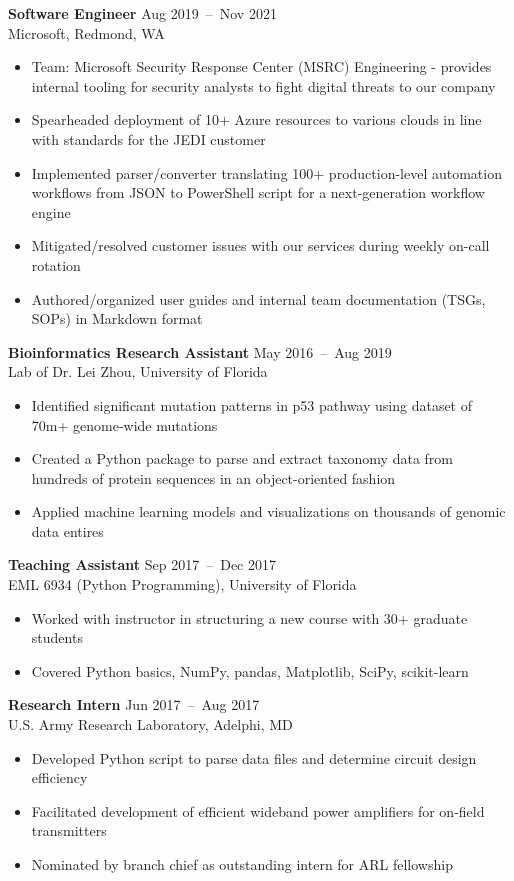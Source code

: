 \documentclass[line,resmargin]{res}
\begin{document}
\begin{resume}
    \textbf{Software Engineer}    \hfill Aug 2019~--~Nov 2021 \\
    Microsoft, Redmond, WA
    \begin{itemize}  \itemsep -2pt
        \item Team: Microsoft Security Response Center (MSRC) Engineering - provides internal tooling for security analysts to fight digital threats to our company
        \item Spearheaded deployment of 10+ Azure resources to various clouds in line with standards for the JEDI customer
        \item Implemented parser/converter translating 100+ production-level automation workflows from JSON to PowerShell script for a next-generation workflow engine
        \item Mitigated/resolved customer issues with our services during weekly on-call rotation
        \item Authored/organized user guides and internal team documentation (TSGs, SOPs) in Markdown format
    \end{itemize}

    \textbf{Bioinformatics Research Assistant}    \hfill May 2016~--~Aug 2019 \\
    Lab of Dr. Lei Zhou, University of Florida
    \begin{itemize}  \itemsep -2pt
        \item Identified significant mutation patterns in p53 pathway using dataset of 70m+ genome-wide mutations
        \item Created a Python package to parse and extract taxonomy data from hundreds of protein sequences in an object-oriented fashion
        \item Applied machine learning models and visualizations on thousands of genomic data entires
    \end{itemize}

    \textbf{Teaching Assistant}    \hfill Sep 2017~--~Dec 2017 \\
    EML 6934 (Python Programming), University of Florida
    \begin{itemize}  \itemsep -2pt
        \item Worked with instructor in structuring a new course with 30+ graduate students
        \item Covered Python basics, NumPy, pandas, Matplotlib, SciPy, scikit-learn
    \end{itemize}

    \textbf{Research Intern}    \hfill Jun 2017~--~Aug 2017 \\
    U.S. Army Research Laboratory, Adelphi, MD
    \begin{itemize}  \itemsep -2pt
        \item Developed Python script to parse data files and determine circuit design efficiency
        \item Facilitated development of efficient wideband power amplifiers for on-field transmitters
        \item Nominated by branch chief as outstanding intern for ARL fellowship
    \end{itemize}


\end{resume}
\end{document}
